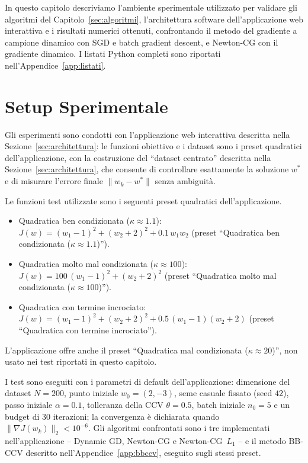 \documentclass[italian, a4paper, twoside, binding=6mm]{sapthesis}
\begin{document}
In questo capitolo descriviamo l'ambiente sperimentale utilizzato per
validare gli algoritmi del Capitolo~\ref{sec:algoritmi}, l'architettura
software dell'applicazione web interattiva e i risultati numerici ottenuti,
confrontando il metodo del gradiente a campione dinamico con SGD e batch
gradient descent, e Newton-CG con il gradiente dinamico. I listati Python
completi sono riportati nell'Appendice~\ref{app:listati}.

\section{Setup Sperimentale}\label{sec:setup}

Gli esperimenti sono condotti con l'applicazione web interattiva descritta
nella Sezione~\ref{sec:architettura}: le funzioni obiettivo e i dataset sono
i preset quadratici dell'applicazione, con la costruzione del ``dataset
centrato'' descritta nella Sezione~\ref{sec:architettura}, che consente di
controllare esattamente la soluzione $w^*$ e di misurare l'errore finale
$\|w_k - w^*\|$ senza ambiguità.

Le funzioni test utilizzate sono i seguenti preset quadratici
dell'applicazione.

\begin{itemize}
  \item Quadratica ben condizionata ($\kappa \approx 1.1$):
  $J(w) = (w_1 - 1)^2 + (w_2 + 2)^2 + 0.1\,w_1 w_2$ (preset ``Quadratica ben
  condizionata ($\kappa \approx 1.1$)'').
  \item Quadratica molto mal condizionata ($\kappa \approx 100$):
  $J(w) = 100\,(w_1 - 1)^2 + (w_2 + 2)^2$ (preset ``Quadratica molto mal
  condizionata ($\kappa \approx 100$)'').
  \item Quadratica con termine incrociato:
  $J(w) = (w_1 - 1)^2 + (w_2 + 2)^2 + 0.5\,(w_1 - 1)(w_2 + 2)$ (preset
  ``Quadratica con termine incrociato'').
\end{itemize}

L'applicazione offre anche il preset ``Quadratica mal condizionata
($\kappa \approx 20$)'', non usato nei test riportati in questo capitolo.

I test sono eseguiti con i parametri di default dell'applicazione:
dimensione del dataset $N = 200$, punto iniziale $w_0 = (2,-3)$, seme
casuale fissato (seed $42$), passo iniziale $\alpha = 0.1$, tolleranza della
CCV $\theta = 0.5$, batch iniziale $n_0 = 5$ e un budget di 30 iterazioni; la
convergenza è dichiarata quando $\|\nabla J(w_k)\|_2 < 10^{-6}$. Gli algoritmi
confrontati sono i tre implementati nell'applicazione -- Dynamic GD,
Newton-CG e Newton-CG~$L_1$ -- e il metodo BB-CCV descritto
nell'Appendice~\ref{app:bbccv}, eseguito sugli stessi preset.
\end{document}
